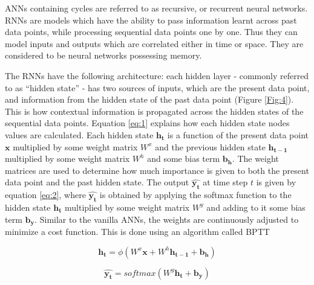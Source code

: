 
\ac{ANN}s containing cycles are referred to as recursive, or recurrent neural networks. \ac{RNN}s are models which have the ability to pass information learnt across past data points, while processing sequential data points one by one. Thus they can model inputs and outputs which are correlated either in time or space. They are considered to be neural networks possessing memory.


The \ac{RNN}s have the following architecture: each hidden layer - commonly referred to as \enquote{hidden state} - has two sources of inputs, which are the present data point, and information from the hidden state of the past data point (Figure \ref{Fig:4}). This is how contextual information is propagated across the hidden states of the sequential data points. 
Equation \ref{eq:1} explains how each hidden state nodes values are calculated. Each hidden state $ \mathbf{h_t} $ is a function of the present data point $ \mathbf{x} $ multiplied by some weight matrix $ W^x $ and the previous hidden state $ \mathbf{h_{t-1}} $ multiplied by some weight matrix $ W^h $ and some bias term $ \mathbf{b_h} $. The weight matrices are used to determine how much importance is given to both the present data point and the past hidden state. The output $ \mathbf{\widehat{y_t}} $ at time step $ t $ is given by equation \ref{eq:2}, where $ \mathbf{\widehat{y_t}} $ is obtained by applying the softmax function to the hidden state $  \mathbf{h_t} $ multiplied by some weight matrix $ W^y $ and adding to it some bias term $ \mathbf{b_y} $. Similar to the vanilla \ac{ANN}s, the weights are continuously adjusted to minimize a cost function. This is done using an algorithm called \ac{BPTT} \cite{werbos1990backpropagation}


\begin{equation}
\label{eq:1}
\mathbf{h_t} = \phi(W^x \mathbf{x} + W^h \mathbf{h_{t-1}} + \mathbf{b_h})
\end{equation}

\begin{equation}
\label{eq:2}
\mathbf{\widehat{y_t}} = softmax(W^y \mathbf{h_t} + \mathbf{b_y})
\end{equation}


